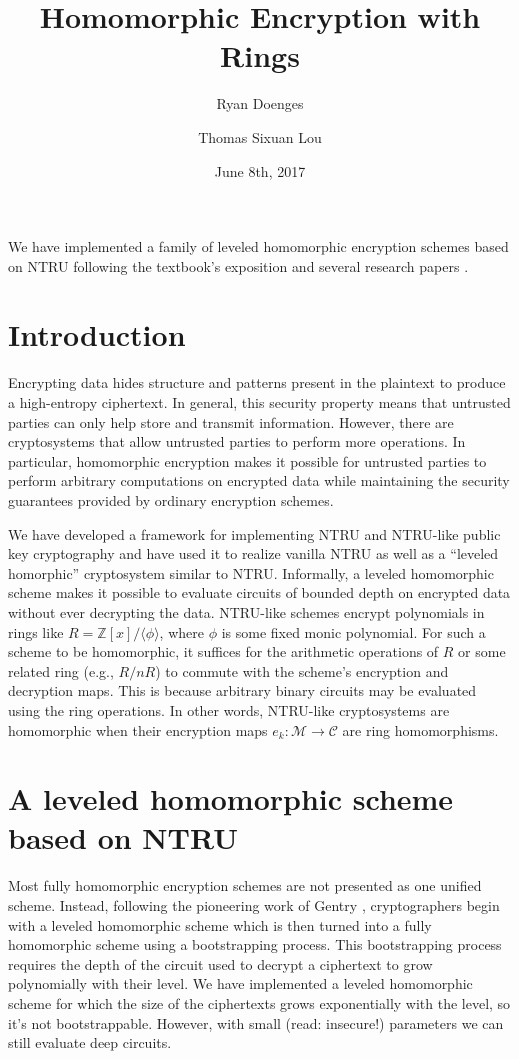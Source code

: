 \documentclass[10pt]{article}
\title{Homomorphic Encryption with Rings}
\author{Ryan Doenges \and Thomas Sixuan Lou}
\date{June 8th, 2017}
\begin{document}
\maketitle

We have implemented a family of leveled homomorphic encryption schemes based on
NTRU following the textbook's exposition \cite{Hoffstein:2014:IMC:2682593} and
several research papers \cite{DBLP:conf/stoc/Lopez-AltTV12}
\cite{DBLP:journals/iacr/DorozHS14}.

\section{Introduction}

Encrypting data hides structure and patterns present in the plaintext to produce
a high-entropy ciphertext. In general, this security property means that
untrusted parties can only help store and transmit information. However, there
are cryptosystems that allow untrusted parties to perform more operations. In
particular, homomorphic encryption makes it possible for untrusted parties to
perform arbitrary computations on encrypted data while maintaining the security
guarantees provided by ordinary encryption schemes.

We have developed a framework for implementing NTRU and NTRU-like public key
cryptography and have used it to realize vanilla NTRU as well as a ``leveled
homorphic'' cryptosystem similar to NTRU. Informally, a leveled homomorphic
scheme makes it possible to evaluate circuits of bounded depth on encrypted data
without ever decrypting the data. NTRU-like schemes encrypt polynomials in rings
like \(R = \mathbb{Z}[x]/\langle \phi \rangle\), where \(\phi\) is some fixed
monic polynomial. For such a scheme to be homomorphic, it suffices for the
arithmetic operations of \(R\) or some related ring (e.g., \(R/nR\)) to commute
with the scheme's encryption and decryption maps. This is because arbitrary
binary circuits may be evaluated using the ring operations. In other words,
NTRU-like cryptosystems are homomorphic when their encryption maps \(e_k :
\mathcal{M} \to \mathcal{C}\) are ring homomorphisms.

\section{A leveled homomorphic scheme based on NTRU}

Most fully homomorphic encryption schemes are not presented as one unified
scheme. Instead, following the pioneering work of Gentry
\cite{DBLP:conf/stoc/Gentry09}, cryptographers begin with a leveled homomorphic
scheme which is then turned into a fully homomorphic scheme using a
bootstrapping process. This bootstrapping process requires the depth of the
circuit used to decrypt a ciphertext to grow polynomially with their level. We
have implemented a leveled homomorphic scheme for which the size of the
ciphertexts grows exponentially with the level, so it's not bootstrappable.
However, with small (read: insecure!) parameters we can still evaluate deep
circuits.
\end{document}
